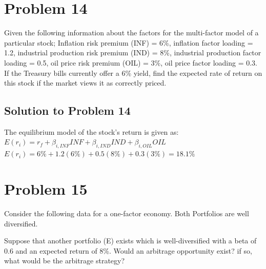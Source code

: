 \documentclass[12]{article}
\begin{document}
\color{black}
\section*{Problem 14}
Given the following information about the factors for the multi-factor model of a particular stock; Inflation risk premium (INF) = 6\%, inflation factor loading = 1.2, industrial production risk premium (IND) = 8\%, industrial production factor loading = 0.5, oil price risk premium (OIL) = 3\%, oil price factor loading = 0.3.
If the Treasury bills currently offer a 6\% yield, find the expected rate of return on this stock if the market views it as correctly priced.


\color{blue}
\subsection*{Solution to Problem 14}
The equilibrium model of the stock's return is given as:\\
$E(r_i) = r_f + \beta_{i,INF}INF + \beta_{i,IND}IND + \beta_{i,OIL}OIL$\\
$E(r_i) = 6\% + 1.2(6\%) + 0.5(8\%) + 0.3(3\%) = 18.1\%$


\color{black}
\section*{Problem 15}
Consider the following data for a one-factor economy. Both Portfolios are well diversified. 
\begin{table}[H]
\centering
{}
\end{table}
\noindent
Suppose that another portfolio (E) exists which is well-diversified with a beta of 0.6 and an expected return of 8\%. Would an arbitrage opportunity exist? if so, what would be the arbitrage strategy?

\color{blue}
\end{document}
